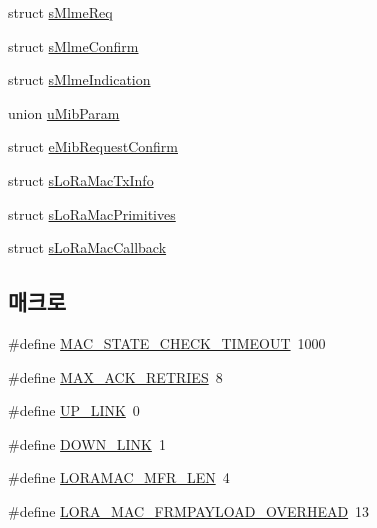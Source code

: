 \begin{DoxyCompactItemize}
\item 
struct \mbox{\hyperlink{structs_mlme_req}{s\+Mlme\+Req}}
\item 
struct \mbox{\hyperlink{structs_mlme_confirm}{s\+Mlme\+Confirm}}
\item 
struct \mbox{\hyperlink{structs_mlme_indication}{s\+Mlme\+Indication}}
\item 
union \mbox{\hyperlink{unionu_mib_param}{u\+Mib\+Param}}
\item 
struct \mbox{\hyperlink{structe_mib_request_confirm}{e\+Mib\+Request\+Confirm}}
\item 
struct \mbox{\hyperlink{structs_lo_ra_mac_tx_info}{s\+Lo\+Ra\+Mac\+Tx\+Info}}
\item 
struct \mbox{\hyperlink{structs_lo_ra_mac_primitives}{s\+Lo\+Ra\+Mac\+Primitives}}
\item 
struct \mbox{\hyperlink{structs_lo_ra_mac_callback}{s\+Lo\+Ra\+Mac\+Callback}}
\end{DoxyCompactItemize}
\subsection*{매크로}
\begin{DoxyCompactItemize}
\item 
\#define \mbox{\hyperlink{group___l_o_r_a_m_a_c_ga3468d8935b09a7191e43fecdd9a15c67}{M\+A\+C\+\_\+\+S\+T\+A\+T\+E\+\_\+\+C\+H\+E\+C\+K\+\_\+\+T\+I\+M\+E\+O\+UT}}~1000
\item 
\#define \mbox{\hyperlink{group___l_o_r_a_m_a_c_ga47bc6aeb5be0ba39387e2049e342fa7e}{M\+A\+X\+\_\+\+A\+C\+K\+\_\+\+R\+E\+T\+R\+I\+ES}}~8
\item 
\#define \mbox{\hyperlink{group___l_o_r_a_m_a_c_ga7e75f3071d6911b19a563d554038f8da}{U\+P\+\_\+\+L\+I\+NK}}~0
\item 
\#define \mbox{\hyperlink{group___l_o_r_a_m_a_c_ga801525db3ba12b250029f026403524b7}{D\+O\+W\+N\+\_\+\+L\+I\+NK}}~1
\item 
\#define \mbox{\hyperlink{group___l_o_r_a_m_a_c_ga1727f288e9a871f1474ce61f942a08f3}{L\+O\+R\+A\+M\+A\+C\+\_\+\+M\+F\+R\+\_\+\+L\+EN}}~4
\item 
\#define \mbox{\hyperlink{group___l_o_r_a_m_a_c_ga9623296c345a3636f460ecdb8b1bbd9d}{L\+O\+R\+A\+\_\+\+M\+A\+C\+\_\+\+F\+R\+M\+P\+A\+Y\+L\+O\+A\+D\+\_\+\+O\+V\+E\+R\+H\+E\+AD}}~13
\end{DoxyCompactItemize}
